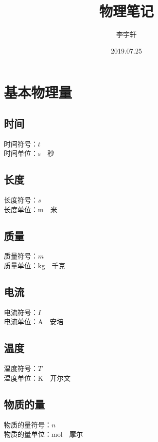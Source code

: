 \documentclass[UTF8]{ctexart}
\title{物理笔记}
\author{李宇轩}
\date{2019.07.25}
\begin{document}
\maketitle

\newpage

\tableofcontents

\newpage

\setlength{\parindent}{0pt}

\newpage

\section{基本物理量}

\subsection{时间}
    时间符号：$t$\\[1mm]
    时间单位：s~~秒\\

\subsection{长度}
    长度符号：$s$\\[1mm]
    长度单位：m~~米\\

\subsection{质量}
    质量符号：$m$\\[1mm]
    质量单位：kg~~千克\\

\subsection{电流}
    电流符号：$I$\\[1mm]
    电流单位：A~~安培\\

\subsection{温度}
    温度符号：$T$\\[1mm]
    温度单位：K~~开尔文\\

\subsection{物质的量}
    物质的量符号：$n$\\[1mm]
    物质的量单位：mol~~摩尔
\end{document}
